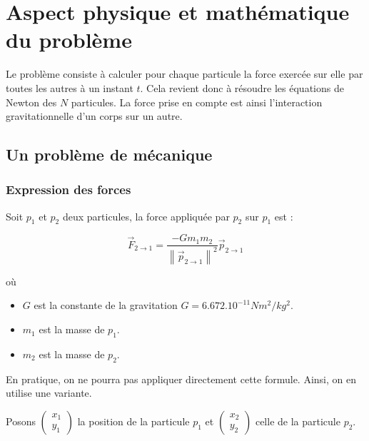 \chapter{Aspect physique et mathématique du problème}
Le problème consiste à calculer pour chaque particule la force exercée sur elle par toutes les autres à un instant $t$.
Cela revient donc à résoudre les équations de Newton des $N$ particules. La force prise en compte est ainsi l'interaction gravitationnelle d'un corps sur un autre.

\section{Un problème de mécanique}
\vspace{2mm}
\subsection{Expression des forces}
\vspace{2mm}

Soit $p_{1}$ et $p_{2}$ deux particules, la force appliquée par $p_2$ sur $p_1$ est :

\begin{equation}
\vec{F}_{2 \rightarrow 1} = \frac{-Gm_1m_2}{{\left\| \vec{p}_{2 \rightarrow 1} \right\|}^2} \vec{p}_{2 \rightarrow 1}
\end{equation}

où 
\begin{itemize}
\item  $G$ est la constante de la gravitation $G = {6.672.10^{-11}}{Nm^2/kg^2}$.

\item $m_1$ est la masse de $p_1$.
\item $m_2$ est la masse de $p_2$.

\end{itemize}

\vspace{2mm}

En pratique, on ne pourra pas appliquer directement cette formule. Ainsi, on en utilise une variante.

Posons $\begin{pmatrix}
x_1\\
y_1
\end{pmatrix}$ la position de la particule $p_1$ et $\begin{pmatrix}
x_2\\
y_2
\end{pmatrix}$ celle de la particule $p_2$.

